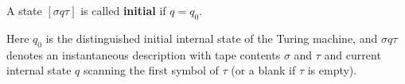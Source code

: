 A state $[\sigma q \tau]$ is called \textbf{initial} if $q = q_0$.

Here $q_0$ is the distinguished initial internal state of the Turing machine, and $\sigma q \tau$ denotes an instantaneous description with tape contents $\sigma$ and $\tau$ and current internal state $q$ scanning the first symbol of $\tau$ (or a blank if $\tau$ is empty).
